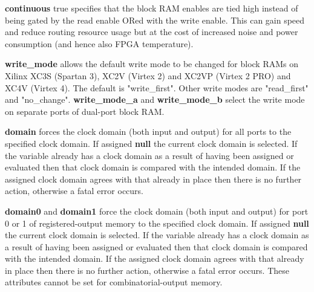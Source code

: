         {\bf continuous} true specifies that the block RAM enables are tied high
        instead of being gated by the read enable ORed with the write enable.
        This can gain speed and reduce routing resource usage but at the
        cost of increased noise and power consumption (and hence also FPGA
        temperature).
        
        {\bf write\_mode} allows the default write mode to be changed for
        block RAMs on Xilinx XC3S (Spartan 3), XC2V (Virtex 2) and
        XC2VP (Virtex 2 PRO) and XC4V (Virtex 4). The default is
        "write\_first". Other write modes are "read\_first" and "no\_change".
        {\bf write\_mode\_a} and {\bf write\_mode\_b} select the write mode on
        separate ports of dual-port block RAM.

        {\bf domain} forces the clock domain (both input and output) for all
        ports to the specified clock domain. If assigned {\bf null} the current
        clock domain is selected. If the variable already has a clock domain as
        a result of having been assigned or evaluated then that clock domain is
        compared with the intended domain. If the assigned clock domain agrees
        with that already in place then there is no further action, otherwise a
        fatal error occurs.

        {\bf domain0} and {\bf domain1} force the clock domain (both input and
        output) for port 0 or 1 of registered-output memory to the specified
        clock domain. If assigned {\bf null} the current clock domain is
        selected. If the variable already has a clock domain as a result of
        having been assigned or evaluated then that clock domain is compared
        with the intended domain. If the assigned clock domain agrees with that
        already in place then there is no further action, otherwise a fatal
        error occurs. These attributes cannot be set for combinatorial-output
        memory.
